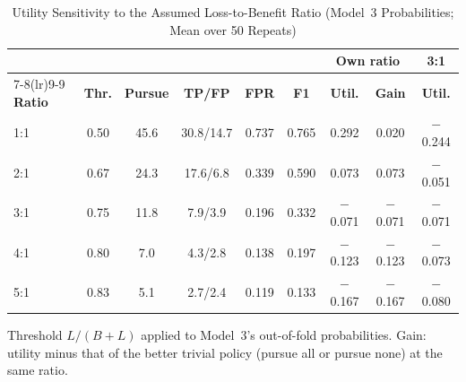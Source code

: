 \begin{table}[!t]
\caption{Utility Sensitivity to the Assumed Loss-to-Benefit Ratio (Model~3 Probabilities; Mean over 50 Repeats)}
\label{tab:sensitivity}
\centering
\footnotesize
\setlength{\tabcolsep}{2.2pt}
\begin{tabular}{lcccccccc}
\toprule
 & & & & & & \multicolumn{2}{c}{\textbf{Own ratio}} & \textbf{3:1} \\
\cmidrule(lr){7-8}\cmidrule(lr){9-9}
\textbf{Ratio} & \textbf{Thr.} & \textbf{Pursue} & \textbf{TP/FP} & \textbf{FPR} & \textbf{F1} & \textbf{Util.} & \textbf{Gain} & \textbf{Util.} \\
\midrule
1:1 & 0.50 & 45.6 & 30.8/14.7 & 0.737 & 0.765 & 0.292 & 0.020 & $-$0.244 \\
2:1 & 0.67 & 24.3 & 17.6/6.8 & 0.339 & 0.590 & 0.073 & 0.073 & $-$0.051 \\
3:1 & 0.75 & 11.8 & 7.9/3.9 & 0.196 & 0.332 & $-$0.071 & $-$0.071 & $-$0.071 \\
4:1 & 0.80 & 7.0 & 4.3/2.8 & 0.138 & 0.197 & $-$0.123 & $-$0.123 & $-$0.073 \\
5:1 & 0.83 & 5.1 & 2.7/2.4 & 0.119 & 0.133 & $-$0.167 & $-$0.167 & $-$0.080 \\
\bottomrule
\end{tabular}
\par\vspace{2pt}\parbox{0.94\columnwidth}{\scriptsize Threshold $L/(B+L)$ applied to Model~3's out-of-fold probabilities. Gain: utility
minus that of the better trivial policy (pursue all or pursue none) at the same ratio.}
\end{table}
